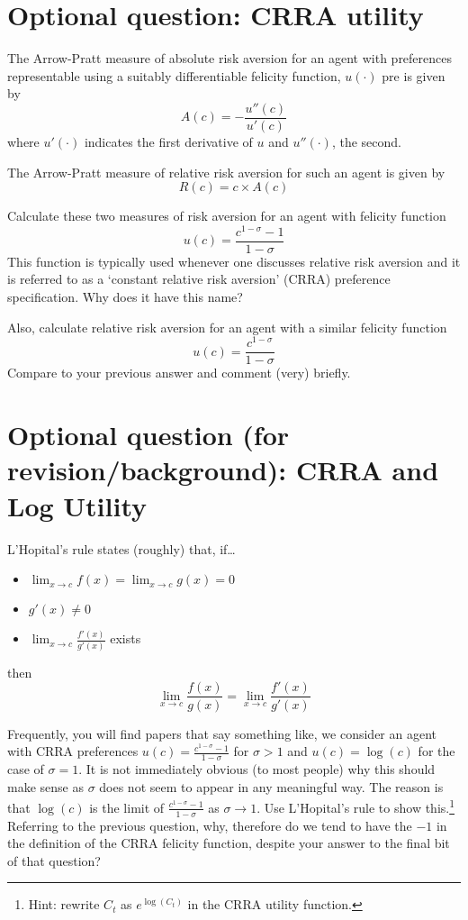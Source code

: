 \documentclass[authoryear,11pt]{elsarticle}
\begin{document}
\section{Optional question: CRRA utility}
The Arrow-Pratt measure of absolute risk aversion for an agent with preferences representable using a suitably differentiable felicity function, $u(\cdot)$ pre is given by
\[
A(c) = - \frac{u''(c)}{u'(c)}
\]
where $u'(\cdot)$ indicates the first derivative of $u$ and $u''(\cdot)$, the second.

The Arrow-Pratt measure of relative risk aversion for such an agent is given by
\[
R(c) = c \times A(c)
\]

Calculate these two measures of risk aversion for an agent with felicity function
\[
u(c) = \frac{c^{1-\sigma} - 1}{1-\sigma}
\]
This function is typically used whenever one discusses relative risk aversion and it is referred to as a `constant relative risk aversion' (CRRA) preference specification. Why does it have this name?

Also, calculate relative risk aversion for an agent with a similar felicity function
\[
u(c) = \frac{c^{1-\sigma}}{1-\sigma}
\]
Compare to your previous answer and comment (very) briefly.

\section{Optional question (for revision/background): CRRA and Log Utility}
L'Hopital's rule states (roughly) that, if\ldots
\begin{itemize}
\item	$\lim_{x \to c} f(x) = \lim_{x \to c} g(x)=0$
\item	$g'(x)\neq0$
\item	$\lim_{x \to c} \frac{f'(x)}{g'(x)}$ exists
\end{itemize}
then
\[
\lim_{x \to c} \frac{f(x)}{g(x)} = \lim_{x \to c} \frac{f'(x)}{g'(x)}
\]

Frequently, you will find papers that say something like, we consider an agent with CRRA preferences $u(c) = \frac{c^{1-\sigma} - 1}{1-\sigma}$ for $\sigma>1$ and $u(c) = \log{(c)}$ for the case of $\sigma=1$. It is not immediately obvious (to most people) why this should make sense as $\sigma$ does not seem to appear in any meaningful way. The reason is that $\log{(c)}$ is the limit of $\frac{c^{1-\sigma} - 1}{1-\sigma}$ as $\sigma \rightarrow 1$. Use L'Hopital's rule to show this.\footnote{Hint: rewrite $C_{t}$ as $e^{\log{(C_{t})}}$ in the CRRA utility function.} Referring to the previous question, why, therefore do we tend to have the $-1$ in the definition of the CRRA felicity function, despite your answer to the final bit of that question?
\end{document}
